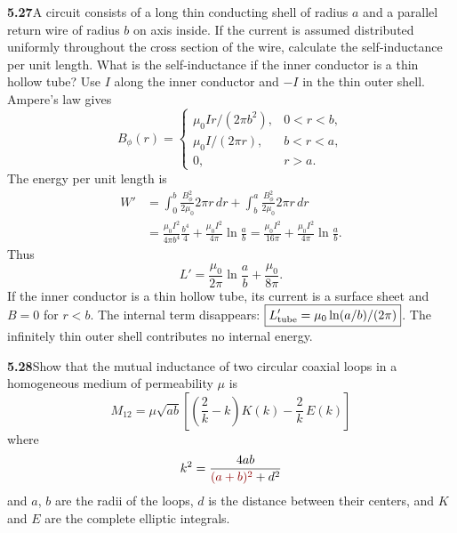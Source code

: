\par\bigskip
\noindent\textbf{5.27}\quad A circuit consists of a long thin conducting shell of radius $a$ and a parallel return wire of radius $b$ on axis inside. If the current is assumed distributed uniformly throughout the cross section of the wire, calculate the self-inductance per unit length. What is the self-inductance if the inner conductor is a thin hollow tube?
\solution
Use $I$ along the inner conductor and $-I$ in the thin outer shell.
Ampere's law gives
\[
B_\phi(r)=
\begin{cases}
\mu_0Ir/(2\pi b^2),&0<r<b,\\
\mu_0I/(2\pi r),&b<r<a,\\
0,&r>a.
\end{cases}
\]
The energy per unit length is
\[
\begin{split}
W'&=\int_0^b\frac{B_\phi^2}{2\mu_0}2\pi r\,dr
+\int_b^a\frac{B_\phi^2}{2\mu_0}2\pi r\,dr\\
&=\frac{\mu_0I^2}{4\pi b^4}\frac{b^4}{4}
+\frac{\mu_0I^2}{4\pi}\ln\frac ab
=\frac{\mu_0I^2}{16\pi}
+\frac{\mu_0I^2}{4\pi}\ln\frac ab.
\end{split}
\]
Thus
\[
\boxed{L'=\frac{\mu_0}{2\pi}\ln\frac ab+\frac{\mu_0}{8\pi}.}
\]
If the inner conductor is a thin hollow tube, its current is a surface
sheet and $B=0$ for $r<b$. The internal term disappears:
$\boxed{L'_{\rm tube}=\mu_0\ln(a/b)/(2\pi)}$.
The infinitely thin outer shell contributes no internal energy.


\par\bigskip
\noindent\textbf{5.28}\quad Show that the mutual inductance of two circular coaxial loops in a homogeneous medium of permeability $\mu$ is
\[
M_{12}=\mu\sqrt{ab}\left[\left(\frac{2}{k}-k\right)\!K(k)-\frac{2}{k}\,E(k)\right]
\]
where
\[
k^{2}=\frac{4ab}{\erratum{(a+b)^{2}}+d^{2}}
\]
and $a$, $b$ are the radii of the loops, $d$ is the distance between their centers, and $K$ and $E$ are the complete elliptic integrals.

